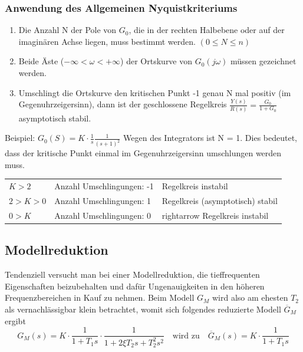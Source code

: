 \subsubsection{Anwendung des Allgemeinen Nyquistkriteriums}
\begin{enumerate}
\item Die Anzahl N der Pole von $G_0$, die in der rechten Halbebene oder auf der
imaginären Achse liegen, muss bestimmt werden. $(0 \leq N \leq n)$
\item Beide Äste ($-\infty < \omega < +\infty$) der Ortskurve von $G_0(j\omega)$ müssen gezeichnet werden.
\item Umschlingt die Ortskurve den kritischen Punkt -1 genau N mal positiv (im
Gegenuhrzeigersinn), dann ist der geschlossene Regelkreis 
$\frac{Y(s)}{R(s)} = \frac{G_0}{1+G_0}$ asymptotisch stabil.
\end{enumerate}
Beispiel: $G_0(S)= K\cdot\frac{1}{s}\frac{1}{(s+1)^2}$
Wegen des Integrators ist N = 1. Dies bedeutet, dass der kritische Punkt
einmal im Gegenuhrzeigersinn umschlungen werden muss.\\
\begin{tabularx}{\textwidth}{XXX}
$K > 2$ & Anzahl Umschlingungen: -1 & Regelkreis instabil \\
$2 > K > 0$ & Anzahl Umschlingungen: 1 & Regelkreis (asymptotisch) stabil\\
$0 >K$ & Anzahl Umschlingungen: 0 & rightarrow Regelkreis instabil\\
\end{tabularx}

\subsection{Modellreduktion}

Tendenziell versucht man bei einer Modellreduktion, die tieffrequenten Eigenschaften
beizubehalten und dafür Ungenauigkeiten in den höheren Frequenzbereichen in
Kauf zu nehmen. Beim Modell $G_M$ wird also am ehesten $T_2$ als vernachlässigbar
klein betrachtet, womit sich folgendes reduzierte Modell $\overline{G}_M$ ergibt
\[G_M(s)=K\cdot\frac{1}{1+T_1s}\cdot\frac{1}{1+2\xi T_2 s +T^2_2 s^2} \quad \text{wird zu} \quad \overline{G}_M(s)=K\cdot\frac{1}{1+T_1s}\]